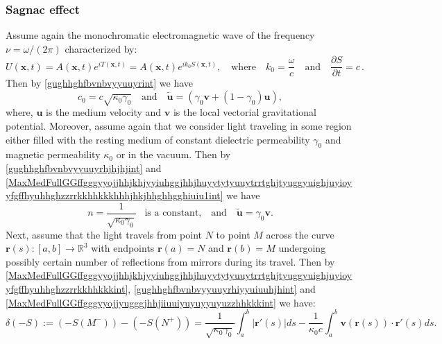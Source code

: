 \documentclass{article}
\theoremstyle{definition}
\theoremstyle{remark}
\renewcommand{\vec}[1]{\mathbf{#1}}
\newcommand{\er}{\eqref}
\newcommand{\er}{\eqref}
\begin{document}
\subsubsection{Sagnac effect}
Assume again the monochromatic electromagnetic wave of the frequency
$\nu=\omega/(2\pi)$ characterized by:
\begin{equation}\label{MaxVacFullPPNmmmffffffiuiuhjuughbghhuiiujjhhjjhjhhjhjjhhjhjjhint}
U(\vec x,t)=A(\vec x,t)e^{iT(\vec x,t)}=A(\vec x,t)e^{ik_0S(\vec
x,t)},\quad\text{where}\quad
k_0=\frac{\omega}{c}\quad\text{and}\quad\frac{\partial S}{\partial
t}=c\,.
\end{equation}
Then by \er{gughhghfbvnbvyyuuyrint} we have
\begin{equation}\label{gughhghfbvnbvyyuuyrhjhjhjint}
c_0=c\sqrt{\kappa_0\gamma_0}\quad\text{and}\quad\vec {\tilde
u}=\left(\gamma_0\vec v+(1-\gamma_0)\vec u\right),
\end{equation}
where, $\vec u$ is the medium velocity and $\vec v$ is the local
vectorial gravitational potential. Moreover, assume again that we
consider light traveling in some region either filled with the
resting medium of constant dielectric permeability $\gamma_0$ and
magnetic permeability $\kappa_0$ or in the vacuum. Then by
\er{gughhghfbvnbvyyuuyrhjhjhjint} and
\er{MaxMedFullGGffgggyyojjhhjkhjyyiuhggjhhjhuyytytyuuytrrtghjtyuggyuighjuyioyyfgffhyuhhghzzrrkkhhkkkhhhjhkjhhghhgghiuiu1int}
we have
\begin{equation}\label{gughhghfbvnbvyyuuyrhiyyuiuuhjhint}
n=\frac{1}{\sqrt{\kappa_0\gamma_0}}\;\;\;\text{is a
constant,}\quad\text{and}\quad\vec {\tilde u}=\gamma_0\vec v.
\end{equation}
Next, assume that the light travels from point $N$ to point $M$
across the curve $\vec r(s):[a,b]\to\mathbb{R}^3$ with endpoints
$\vec r(a)=N$ and $\vec r(b)=M$ undergoing possibly certain number
of reflections from mirrors during its travel. Then by
\er{MaxMedFullGGffgggyyojjhhjkhjyyiuhggjhhjhuyytytyuuytrrtghjtyuggyuighjuyioyyfgffhyuhhghzzrrkkhhkkkint},
\er{gughhghfbvnbvyyuuyrhiyyuiuuhjhint} and
\er{MaxMedFullGGffgggyyojjyugggjhhjiiuuiyuyuyyuyuzzhhkkkint} we
have:
\begin{equation}\label{MaxMedFullGGffgggyyojjhhjkhjyyiuhggjhhjhuyytytyuuytrrtghjtyuggyuighjuyioyyfgffhyuhhghzzrrkkhhkkkhjjhint}
\delta(-S):=\left(-S(M^-)\right)-
\left(-S(N^+)\right)=\frac{1}{\sqrt{\kappa_0\gamma_0}}\int_a^b
\left|\vec r'(s)\right|ds-\frac{1}{\kappa_0 c}\int_a^b\vec
v\left(\vec r(s)\right)\cdot\vec r'(s)ds.
\end{equation}
\end{document}
